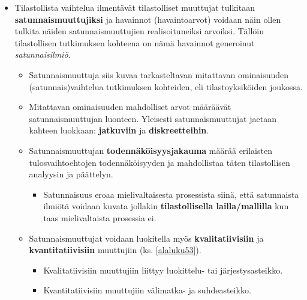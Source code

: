\documentclass[
]{book}
\providecommand{\tightlist}{%
  \setlength{\itemsep}{0pt}\setlength{\parskip}{0pt}}
\begin{document}
\begin{itemize}
\tightlist
\item
  Tilastollista vaihtelua ilmentävät tilastolliset muuttujat tulkitaan \textbf{satunnaismuuttujiksi} ja havainnot (havaintoarvot) voidaan näin ollen tulkita näiden satunnaismuuttujien realisoituneiksi arvoiksi. Tällöin tilastollisen tutkimuksen kohteena on nämä havainnot generoinut \emph{satunnaisilmiö}.

  \begin{itemize}
  \tightlist
  \item
    Satunnaismuuttuja siis kuvaa tarkasteltavan mitattavan ominaisuuden (satunnais)vaihtelua tutkimuksen kohteiden, eli tilastoyksiköiden joukossa.
  \item
    Mitattavan ominaisuuden mahdolliset arvot määräävät satunnaismuuttujan luonteen. Yleisesti satunnaismuuttujat jaetaan kahteen luokkaan: \textbf{jatkuviin} ja \textbf{diskreetteihin}.
  \item
    Satunnaismuuttujan \textbf{todennäköisyysjakauma} määrää erilaisten tulosvaihtoehtojen todennäköisyyden ja mahdollistaa täten tilastollisen analyysin ja päättelyn.

    \begin{itemize}
    \tightlist
    \item
      Satunnaisuus eroaa mielivaltaisesta prosessista siinä, että satunnaista ilmiötä voidaan kuvata jollakin \textbf{tilastollisella lailla/mallilla} kun taas mielivaltaista prosessia ei.
    \end{itemize}
  \item
    Satunnaismuuttujat voidaan luokitella myös \textbf{kvalitatiivisiin} ja \textbf{kvantitatiivisiin} muuttujiin (ks. \ref{alaluku53}).

    \begin{itemize}
    \tightlist
    \item
      Kvalitatiivisiin muuttujiin liittyy luokittelu- tai järjestysasteikko.
    \item
      Kvantitatiivisiin muuttujiin välimatka- ja suhdeasteikko.
    \end{itemize}
  \end{itemize}
\end{itemize}
\end{document}

